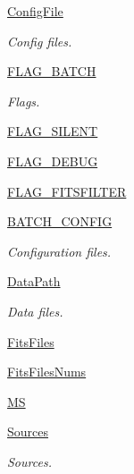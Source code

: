 \begin{DoxyCompactItemize}
\item 
\hyperlink{class_pipeline-0_1_1_pipeline_af72315ecf610a2978e73270f997c37bb}{\-Config\-File}
\begin{DoxyCompactList}\small\item\em \-Config files. \end{DoxyCompactList}\item 
\hyperlink{class_pipeline-0_1_1_pipeline_a8192464f9cf18d25a2ae7af2c1645cba}{\-F\-L\-A\-G\-\_\-\-B\-A\-T\-C\-H}
\begin{DoxyCompactList}\small\item\em \-Flags. \end{DoxyCompactList}\item 
\hyperlink{class_pipeline-0_1_1_pipeline_a422a3ecfc456e94cba4f7ed9ad334ed3}{\-F\-L\-A\-G\-\_\-\-S\-I\-L\-E\-N\-T}
\item 
\hyperlink{class_pipeline-0_1_1_pipeline_a33a6bd8e911133b41c3f6e6bb4763d2a}{\-F\-L\-A\-G\-\_\-\-D\-E\-B\-U\-G}
\item 
\hyperlink{class_pipeline-0_1_1_pipeline_afd62807adb5d9a6f8628c81a82a8094f}{\-F\-L\-A\-G\-\_\-\-F\-I\-T\-S\-F\-I\-L\-T\-E\-R}
\item 
\hyperlink{class_pipeline-0_1_1_pipeline_a557b80e76ada1e5a207c09bbbfef976a}{\-B\-A\-T\-C\-H\-\_\-\-C\-O\-N\-F\-I\-G}
\begin{DoxyCompactList}\small\item\em \-Configuration files. \end{DoxyCompactList}\item 
\hyperlink{class_pipeline-0_1_1_pipeline_a1712d16339b9cfc8dd04d4511270e377}{\-Data\-Path}
\begin{DoxyCompactList}\small\item\em \-Data files. \end{DoxyCompactList}\item 
\hyperlink{class_pipeline-0_1_1_pipeline_aae7af5e45816e5ae7cf6a5f605c3866f}{\-Fits\-Files}
\item 
\hyperlink{class_pipeline-0_1_1_pipeline_af60d62eda58779b4d0856bdb5530b7ca}{\-Fits\-Files\-Nums}
\item 
\hyperlink{class_pipeline-0_1_1_pipeline_a8b13afbbc79c861e5be4d8381217c566}{\-M\-S}
\item 
\hyperlink{class_pipeline-0_1_1_pipeline_ab108fc59eca96f985ff9189932d1ac5c}{\-Sources}
\begin{DoxyCompactList}\small\item\em \-Sources. \end{DoxyCompactList}\item 

\end{DoxyCompactItemize}
